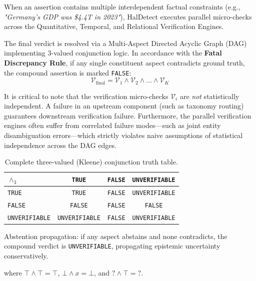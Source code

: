 When an assertion contains multiple interdependent factual constraints (e.g., \textit{"Germany's GDP was \$4.4T in 2023"}), HalDetect executes parallel micro-checks across the Quantitative, Temporal, and Relational Verification Engines.

The final verdict is resolved via a Multi-Aspect Directed Acyclic Graph (DAG) implementing 3-valued conjunction logic. In accordance with the \textbf{Fatal Discrepancy Rule}, if any single constituent aspect contradicts ground truth, the compound assertion is marked \texttt{FALSE}:
\begin{equation}
    \mathcal{V}_{\text{final}} = \mathcal{V}_1 \wedge \mathcal{V}_2 \wedge \dots \wedge \mathcal{V}_K
\end{equation}

It is critical to note that the verification micro-checks $\mathcal{V}_i$ are \textit{not} statistically independent. A failure in an upstream component (such as taxonomy routing) guarantees downstream verification failure. Furthermore, the parallel verification engines often suffer from correlated failure modes---such as joint entity disambiguation errors---which strictly violates naive assumptions of statistical independence across the DAG edges.


\begin{table}[h]
\centering
\caption{Complete three-valued (Kleene) conjunction truth table.}
\label{tab:kleene}
\begin{tabular}{l|ccc}
$\wedge_3$ & \texttt{TRUE} & \texttt{FALSE} & \texttt{UNVERIFIABLE} \\
\hline
\texttt{TRUE}         & \texttt{TRUE}  & \texttt{FALSE} & \texttt{UNVERIFIABLE} \\
\texttt{FALSE}        & \texttt{FALSE} & \texttt{FALSE} & \texttt{FALSE} \\
\texttt{UNVERIFIABLE} & \texttt{UNVERIFIABLE} & \texttt{FALSE} & \texttt{UNVERIFIABLE} \\
\end{tabular}
\end{table}

Abstention propagation: if any aspect abstains and none contradicts, the compound verdict is \texttt{UNVERIFIABLE}, propagating epistemic uncertainty conservatively.

where $\top \wedge \top = \top$, $\bot \wedge x = \bot$, and $? \wedge \top = ?$.

